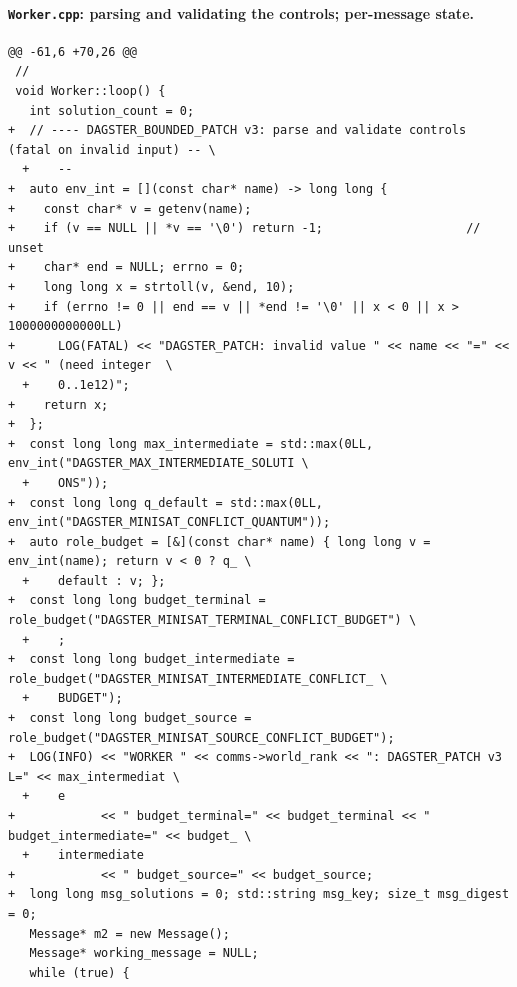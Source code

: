\documentclass[11pt,a4paper]{article}
\begin{document}
\paragraph{\texttt{Worker.cpp}: parsing and validating the controls; per-message state.}
{\scriptsize\begin{verbatim}
@@ -61,6 +70,26 @@
 //
 void Worker::loop() {
   int solution_count = 0;
+  // ---- DAGSTER_BOUNDED_PATCH v3: parse and validate controls (fatal on invalid input) -- \
  +    --
+  auto env_int = [](const char* name) -> long long {
+    const char* v = getenv(name);
+    if (v == NULL || *v == '\0') return -1;                    // unset
+    char* end = NULL; errno = 0;
+    long long x = strtoll(v, &end, 10);
+    if (errno != 0 || end == v || *end != '\0' || x < 0 || x > 1000000000000LL)
+      LOG(FATAL) << "DAGSTER_PATCH: invalid value " << name << "=" << v << " (need integer  \
  +    0..1e12)";
+    return x;
+  };
+  const long long max_intermediate = std::max(0LL, env_int("DAGSTER_MAX_INTERMEDIATE_SOLUTI \
  +    ONS"));
+  const long long q_default = std::max(0LL, env_int("DAGSTER_MINISAT_CONFLICT_QUANTUM"));
+  auto role_budget = [&](const char* name) { long long v = env_int(name); return v < 0 ? q_ \
  +    default : v; };
+  const long long budget_terminal = role_budget("DAGSTER_MINISAT_TERMINAL_CONFLICT_BUDGET") \
  +    ;
+  const long long budget_intermediate = role_budget("DAGSTER_MINISAT_INTERMEDIATE_CONFLICT_ \
  +    BUDGET");
+  const long long budget_source = role_budget("DAGSTER_MINISAT_SOURCE_CONFLICT_BUDGET");
+  LOG(INFO) << "WORKER " << comms->world_rank << ": DAGSTER_PATCH v3 L=" << max_intermediat \
  +    e
+            << " budget_terminal=" << budget_terminal << " budget_intermediate=" << budget_ \
  +    intermediate
+            << " budget_source=" << budget_source;
+  long long msg_solutions = 0; std::string msg_key; size_t msg_digest = 0;
   Message* m2 = new Message();
   Message* working_message = NULL;
   while (true) {
\end{verbatim}}
\end{document}
